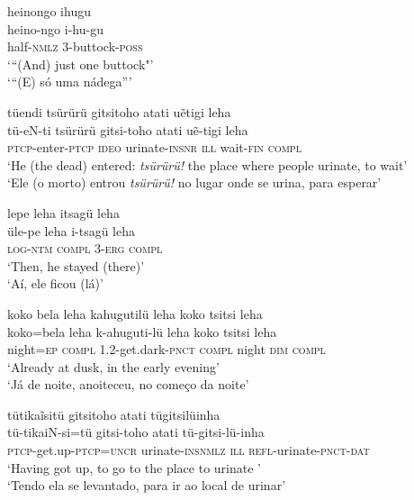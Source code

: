 \documentclass[output=paper,
modfonts,nonflat
]{langsci/langscibook}
\begin{document}
\ea heinongo ihugu \\[.3em]
\gll heino-ngo i-hu-gu \\
half\textsc{-nmlz} 3-buttock-\textsc{poss} \\
\glt ‘“(And) just one buttock"’ \\
‘“(E) só uma nádega”’ \\
\z

\newpage 
\ea tüendi tsürürü gitsitoho{\footnotemark}{} atati uẽtigi leha \\[.3em]
\gll tü-eN-ti tsürürü gitsi-toho atati uẽ-tigi leha \\
\textsc{ptcp}-enter-\textsc{ptcp} \textsc{ideo} urinate-\textsc{insnr} \textsc{ill} wait\textsc{-fin} \textsc{compl} \\
\glt ‘He (the dead) entered: \textit{tsürürü!} the place where people urinate, to wait’ \\
‘Ele (o morto) entrou \textit{tsürürü!} no lugar onde se urina, para esperar’ \\
\z

\ea lepe leha itsagü leha \\[.3em]
\gll üle-pe leha i-tsagü leha \\
\textsc{log-ntm} \textsc{compl} 3\textsc{-erg} \textsc{compl} \\
\glt ‘Then, he stayed (there)’ \\
‘Aí, ele ficou (lá)’ \\
\z

 
\ea koko bela leha kahugutilü leha koko tsitsi leha \\[.3em]
\gll koko=bela leha k-ahuguti-lü leha koko tsitsi leha \\
night=\textsc{ep} \textsc{compl} 1.2-get.dark-\textsc{pnct} \textsc{compl} night \textsc{dim} \textsc{compl} \\
\glt ‘Already at dusk, in the early evening’ \\
‘Já de noite, anoiteceu, no começo da noite’ \\
\z

\ea tütikaĩsitü gitsitoho atati tügitsilüinha \\[.3em]
\gll tü-tikaiN-si=tü gitsi-toho atati tü-gitsi-lü-inha \\
\textsc{ptcp}-get.up-\textsc{ptcp=uncr} urinate-\textsc{insnmlz} \textsc{ill} \textsc{refl}-urinate-\textsc{pnct-dat} \\
\glt ‘Having got up, to go to the place to urinate ' \\
‘Tendo ela se levantado, para ir ao local de urinar’ \\
\z
\end{document}
